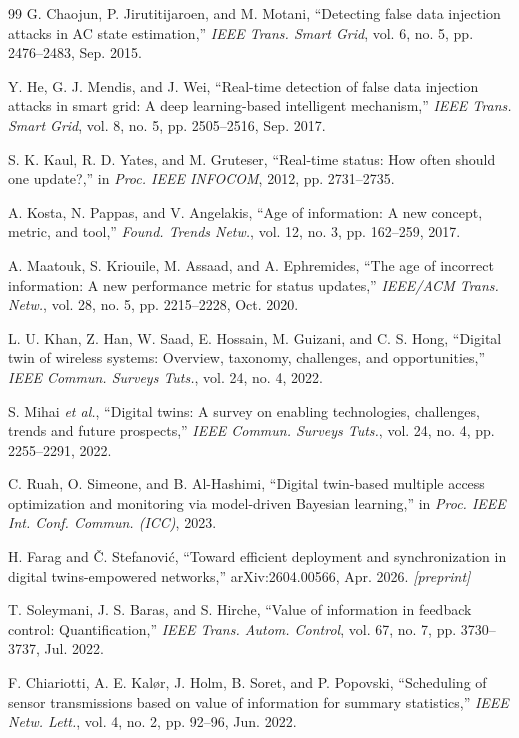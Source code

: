 \documentclass[journal]{IEEEtran}
\theoremstyle{plain}
\theoremstyle{definition}
\theoremstyle{remark}
\begin{document}
\begin{thebibliography}{99}
 G. Chaojun, P. Jirutitijaroen, and M. Motani, ``Detecting false data injection attacks in AC state estimation,'' \emph{IEEE Trans. Smart Grid}, vol. 6, no. 5, pp. 2476--2483, Sep. 2015.

 Y. He, G. J. Mendis, and J. Wei, ``Real-time detection of false data injection attacks in smart grid: A deep learning-based intelligent mechanism,'' \emph{IEEE Trans. Smart Grid}, vol. 8, no. 5, pp. 2505--2516, Sep. 2017.

 S. K. Kaul, R. D. Yates, and M. Gruteser, ``Real-time status: How often should one update?,'' in \emph{Proc. IEEE INFOCOM}, 2012, pp. 2731--2735.

 A. Kosta, N. Pappas, and V. Angelakis, ``Age of information: A new concept, metric, and tool,'' \emph{Found. Trends Netw.}, vol. 12, no. 3, pp. 162--259, 2017.

 A. Maatouk, S. Kriouile, M. Assaad, and A. Ephremides, ``The age of incorrect information: A new performance metric for status updates,'' \emph{IEEE/ACM Trans. Netw.}, vol. 28, no. 5, pp. 2215--2228, Oct. 2020.

 L. U. Khan, Z. Han, W. Saad, E. Hossain, M. Guizani, and C. S. Hong, ``Digital twin of wireless systems: Overview, taxonomy, challenges, and opportunities,'' \emph{IEEE Commun. Surveys Tuts.}, vol. 24, no. 4, 2022.

 S. Mihai \emph{et al.}, ``Digital twins: A survey on enabling technologies, challenges, trends and future prospects,'' \emph{IEEE Commun. Surveys Tuts.}, vol. 24, no. 4, pp. 2255--2291, 2022.

 C. Ruah, O. Simeone, and B. Al-Hashimi, ``Digital twin-based multiple access optimization and monitoring via model-driven Bayesian learning,'' in \emph{Proc. IEEE Int. Conf. Commun. (ICC)}, 2023.

 H. Farag and \v{C}. Stefanovi\'{c}, ``Toward efficient deployment and synchronization in digital twins-empowered networks,'' arXiv:2604.00566, Apr. 2026. \emph{[preprint]}

 T. Soleymani, J. S. Baras, and S. Hirche, ``Value of information in feedback control: Quantification,'' \emph{IEEE Trans. Autom. Control}, vol. 67, no. 7, pp. 3730--3737, Jul. 2022.

 F. Chiariotti, A. E. Kal\o{}r, J. Holm, B. Soret, and P. Popovski, ``Scheduling of sensor transmissions based on value of information for summary statistics,'' \emph{IEEE Netw. Lett.}, vol. 4, no. 2, pp. 92--96, Jun. 2022.


\end{thebibliography}
\end{document}
